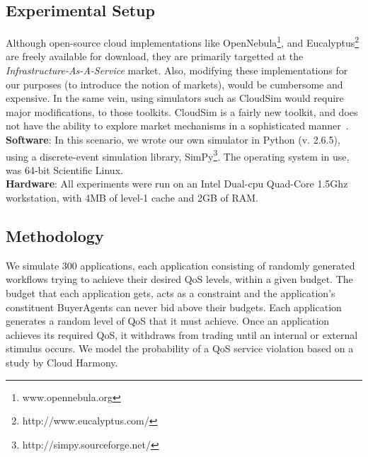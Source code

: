 \documentclass[10pt,journal,compsoc]{IEEEtran}
\begin{document}
\subsection{Experimental Setup}
Although open-source cloud implementations like OpenNebula\footnote{www.opennebula.org}, and Eucalyptus\footnote{http://www.eucalyptus.com/} are freely available for download, they are primarily targetted at the \textit{Infrastructure-As-A-Service} market. Also, modifying these implementations for our purposes (to introduce the notion of markets), would be cumbersome and expensive. In the same vein, using simulators such as CloudSim would require major modifications, to those toolkits. CloudSim is a fairly new toolkit, and does not have the ability to explore market mechanisms in a sophisticated manner~\cite{Breskovic2011Towards}. \\
\textbf{Software}: In this scenario, we wrote our own simulator in Python (v. 2.6.5), using a discrete-event simulation library, SimPy\footnote{http://simpy.sourceforge.net/}. The operating system in use, was 64-bit Scientific Linux.\\
\textbf{Hardware}: All experiments were run on an Intel Dual-cpu Quad-Core 1.5Ghz workstation, with 4MB of level-1 cache and 2GB of RAM.\\
\subsection{Methodology}
We simulate 300 applications, each application consisting of randomly generated workflows trying to achieve their desired QoS levels, within a given budget. The budget that each application gets, acts as a constraint and the application's constituent BuyerAgents can never bid above their budgets. Each application generates a random level of QoS that it must achieve. Once an application achieves its required QoS, it withdraws from trading until an internal or external stimulus occurs. We model the probability of a QoS service violation based on a study by Cloud Harmony\cite{2011CloudHarmonyStudy}.\\
\end{document}
